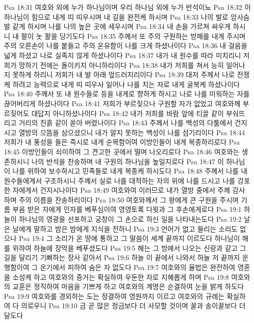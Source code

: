 Psa 18:31  여호와 외에 누가 하나님이며 우리 하나님 외에 누가 반석이뇨
Psa 18:32  이 하나님이 힘으로 내게 띠 띠우시며 내 길을 완전케 하시며
Psa 18:33  나의 발로 암사슴 발 같게 하시며 나를 나의 높은 곳에 세우시며
Psa 18:34  내 손을 가르쳐 싸우게 하시니 내 팔이 놋 활을 당기도다
Psa 18:35  주께서 또 주의 구원하는 방패를 내게 주시며 주의 오른손이 나를 붙들고 주의 온유함이 나를 크게 하셨나이다
Psa 18:36  내 걸음을 넓게 하셨고 나로 실족지 않게 하셨나이다
Psa 18:37  내가 내 원수를 따라 미치리니 저희가 망하기 전에는 돌이키지 아니하리이다
Psa 18:38  내가 저희를 쳐서 능히 일어나지 못하게 하리니 저희가 내 발 아래 엎드러지리이다
Psa 18:39  대저 주께서 나로 전쟁케 하려고 능력으로 내게 띠 띠우사 일어나 나를 치는 자로 내게 굴복케 하셨나이다
Psa 18:40  주께서 또 내 원수들로 등을 내게로 향하게 하시고 나로 나를 미워하는 자를 끊어버리게 하셨나이다
Psa 18:41  저희가 부르짖으나 구원할 자가 없었고 여호와께 부르짖어도 대답지 아니하셨나이다
Psa 18:42  내가 저희를 바람 앞에 티끌 같이 부숴뜨리고 거리의 진흙 같이 쏟아 버렸나이다
Psa 18:43  주께서 나를 백성의 다툼에서 건지시고 열방의 으뜸을 삼으셨으니 내가 알지 못하는 백성이 나를 섬기리이다
Psa 18:44  저희가 내 풍성을 들은 즉시로 내게 순복함이여 이방인들이 내게 복종하리로다
Psa 18:45  이방인들이 쇠미하여 그 견고한 곳에서 떨며 나오리로다
Psa 18:46  여호와는 생존하시니 나의 반석을 찬송하며 내 구원의 하나님을 높일지로다
Psa 18:47  이 하나님이 나를 위하여 보수하시고 민족들로 내게 복종케 하시도다
Psa 18:48  주께서 나를 내 원수들에게서 구조하시니 주께서 실로 나를 대적하는 자의 위에 나를 드시고 나를 강포한 자에게서 건지시나이다
Psa 18:49  여호와여 이러므로 내가 열방 중에서 주께 감사하며 주의 이름을 찬송하리이다
Psa 18:50  여호와께서 그 왕에게 큰 구원을 주시며 기름 부음 받은 자에게 인자를 베푸심이여 영영토록 다윗과 그 후손에게로다
Psa 19:1  하늘이 하나님의 영광을 선포하고 궁창이 그 손으로 하신 일을 나타내는도다
Psa 19:2  날은 날에게 말하고 밤은 밤에게 지식을 전하니
Psa 19:3  언어가 없고 들리는 소리도 없으나
Psa 19:4  그 소리가 온 땅에 통하고 그 말씀이 세계 끝까지 이르도다 하나님이 해를 위하여 하늘에 장막을 베푸셨도다
Psa 19:5  해는 그 방에서 나오는 신랑과 같고 그 길을 달리기 기뻐하는 장사 같아서
Psa 19:6  하늘 이 끝에서 나와서 하늘 저 끝까지 운행함이여 그 온기에서 피하여 숨은 자 없도다
Psa 19:7  여호와의 율법은 완전하여 영혼을 소성케 하고 여호와의 증거는 확실하여 우둔한 자로 지혜롭게 하며
Psa 19:8  여호와의 교훈은 정직하여 마음을 기쁘게 하고 여호와의 계명은 순결하여 눈을 밝게 하도다
Psa 19:9  여호와를 경외하는 도는 정결하여 영원까지 이르고 여호와의 규례는 확실하여 다 의로우니
Psa 19:10  금 곧 많은 정금보다 더 사모할 것이며 꿀과 송이꿀보다 더 달도다
